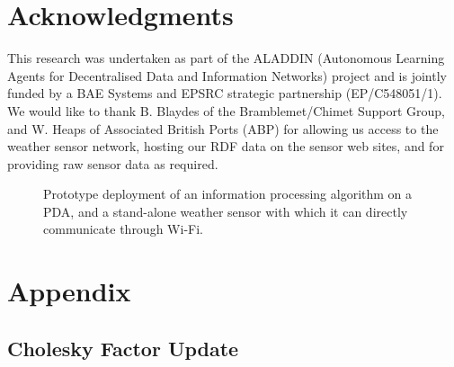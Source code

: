 \documentclass{acmtrans2m}
\begin{document}
\section*{Acknowledgments}

\noindent This research was undertaken as part of the ALADDIN (Autonomous Learning Agents for Decentralised Data and Information Networks) project and is jointly funded by a BAE Systems and EPSRC strategic partnership (EP/C548051/1). We would like to thank B. Blaydes of the Bramblemet/Chimet Support Group, and W. Heaps of Associated British Ports (ABP) for allowing us access to the weather sensor network, hosting our RDF data on the sensor web sites, and for providing raw sensor data as required.

\begin{figure}[tp!]
\begin{center}
\hspace{1.0cm}
\caption{Prototype deployment of an information processing algorithm on a PDA, and a stand-alone weather sensor with which it can directly communicate through Wi-Fi.}
\label{trimble}
\end{center}
\end{figure}
  



\appendix

\section{Appendix} \label{sec:Appendix}

\subsection{Cholesky Factor Update} \label{sec:CholeskyUpdate}

\small
\end{document}

